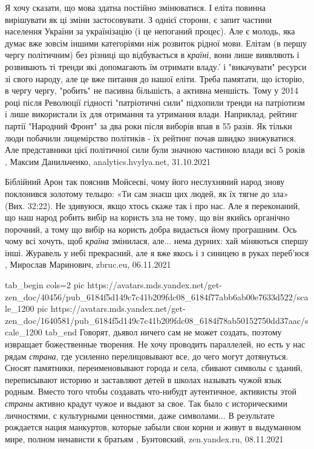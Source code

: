 Я хочу сказати, що мова здатна постійно змінюватися. І еліта повинна вирішувати
як ці зміни застосовувати. З однієї сторони, є запит частини населення України
за українізацію (і це непоганий процес). Але є молодь, яка думає вже зовсім
іншими категоріями ніж розвиток рідної мови. Елітам (в першу чергу політичним)
без різниці що відбувається в \emph{країні}, вони лише виявляють і розвивають ті
тренди які допомагають їм отримати владу.' і "викачувати" ресурси зі свого
народу, але це вже питання до нашої еліти. Треба памятати, що історію, в чергу
чергу, "робить" не пасивна більшість, а активна меншість. Тому у 2014 році
після Революції гідності "патріотичні сили" підхопили тренди на патріотизм і
лише використали їх для отримання та утримання влади. Наприклад, рейтинг партії
"Народний Фронт" за два роки після виборів впав в 55 разів. Як тільки люди
побачили лицемірство політиків - їх рейтинг почав швидко знижуватися. Але
представники цієї політичної сили були значною частиною влади всі 5 років
, 
Максим Данильченко, analytics.hvylya.net, 31.10.2021

Біблійний Арон так пояснив Мойсеєві, чому його неслухняний народ знову
поклонився золотому тельцю: «Ти сам знаєш цих людей, як їх тягне до зла» (Вих.
32:22). Не здивуюся, якщо хтось скаже так і про нас. Але я переконаний, що наш
народ робить вибір на користь зла не тому, що він якийсь органічно порочний, а
тому що вибір на користь добра видається йому програшним. Ось чому всі хочуть,
щоб \emph{країна} змінилася, але... нема дурних: хай міняються спершу інші. Журавель у
небі прекрасний, але я вже якось і з синицею в руках переб’юся
, 
Мирослав Маринович, zbruc.eu, 06.11.2021


\ifcmt
  tab_begin cols=2
     pic https://avatars.mds.yandex.net/get-zen_doc/40456/pub_6184f5d149c7c41b209fdc08_6184f77abb6ab00e7633d522/scale_1200
     pic https://avatars.mds.yandex.net/get-zen_doc/1640581/pub_6184f5d149c7c41b209fdc08_6184f78ab50152750dd37aac/scale_1200
  tab_end
\fi
Говорят, дьявол ничего сам не может создать, поэтому извращает божественные
творения.  Не хочу проводить параллелей, но есть у нас рядам \emph{страна}, где
усиленно перелицовывают все, до чего могут дотянуться. Сносят памятники,
переименовывают города и села, сбивают символы с зданий, переписывают историю и
заставляют детей в школах называть чужой язык родным. Вместо того чтобы
создавать что-нибудт аутентичное, активисты этой \emph{страны} активно крадут
чужое и выдают за свое. Так было с историческими личностями, с культурными
ценностями, даже символами... В результате рождается нация манкуртов, которые
забыли свои корни и живут в выдуманном мире, полном ненависти к братьям
, Бунтовский, zen.yandex.ru, 08.11.2021

